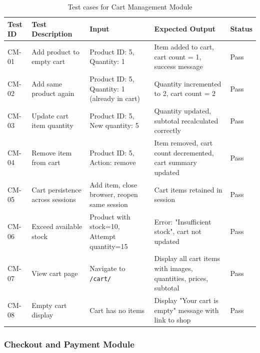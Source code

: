 \begin{table}[H]
\centering
\caption{Test cases for Cart Management Module}
\label{tab:test-cart}
\small
\begin{tabular}{|p{1.3cm}|p{3.5cm}|p{3cm}|p{3.5cm}|p{1.2cm}|}
\hline
\textbf{Test ID} & \textbf{Test Description} & \textbf{Input} & \textbf{Expected Output} & \textbf{Status} \\
\hline
CM-01 & Add product to empty cart & Product ID: 5, Quantity: 1 & Item added to cart, cart count = 1, success message & Pass \\
\hline
CM-02 & Add same product again & Product ID: 5, Quantity: 1 (already in cart) & Quantity incremented to 2, cart count = 2 & Pass \\
\hline
CM-03 & Update cart item quantity & Product ID: 5, New quantity: 5 & Quantity updated, subtotal recalculated correctly & Pass \\
\hline
CM-04 & Remove item from cart & Product ID: 5, Action: remove & Item removed, cart count decremented, cart summary updated & Pass \\
\hline
CM-05 & Cart persistence across sessions & Add item, close browser, reopen same session & Cart items retained in session & Pass \\
\hline
CM-06 & Exceed available stock & Product with stock=10, Attempt quantity=15 & Error: "Insufficient stock", cart not updated & Pass \\
\hline
CM-07 & View cart page & Navigate to \texttt{/cart/} & Display all cart items with images, quantities, prices, subtotal & Pass \\
\hline
CM-08 & Empty cart display & Cart has no items & Display "Your cart is empty" message with link to shop & Pass \\
\hline
\end{tabular}
\end{table}

\subsubsection*{Checkout and Payment Module}

